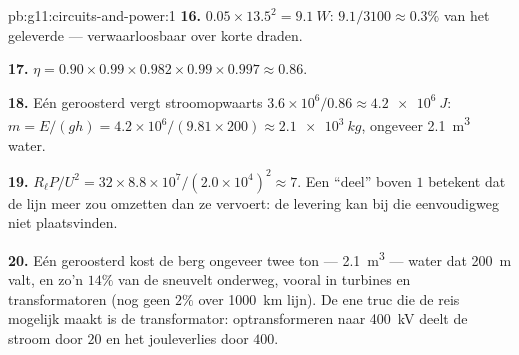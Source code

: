 \begin{solution}{pb:g11:circuits-and-power:1}
\textbf{16.} $0.05 \times 13.5^2 = \qty{9.1}{W}$: $9.1/3100 \approx
0.3\%$ van het geleverde  --- verwaarloosbaar over korte draden.

\textbf{17.} $\eta = 0.90 \times 0.99 \times 0.982 \times 0.99 \times
0.997 \approx 0.86$.

\textbf{18.} Eén geroosterd  vergt stroomopwaarts
$3.6\times10^{6}/0.86 \approx \qty{4.2e6}{J}$: $m = E/(gh) =
4.2\times10^{6}/(9.81 \times 200) \approx \qty{2.1e3}{kg}$, ongeveer
\qty{2.1}{m^3} water.

\textbf{19.} $R_\ell P/U^2 = 32 \times 8.8\times10^{7}/(2.0\times
10^{4})^2 \approx 7$. Een ``deel'' boven $1$ betekent dat de lijn meer
zou omzetten dan ze vervoert: de levering kan bij die 
eenvoudigweg niet plaatsvinden.

\textbf{20.} Eén geroosterd  kost de berg ongeveer twee ton
--- \qty{2.1}{m^3} --- water dat \qty{200}{m} valt, en zo'n $14\%$ van de
 sneuvelt onderweg, vooral in turbines en transformatoren (nog
geen $2\%$ over \qty{1000}{km} lijn). De ene truc die de reis mogelijk
maakt is de transformator: optransformeren naar \qty{400}{kV} deelt de
stroom door $20$ en het jouleverlies door $400$.
\end{solution}

